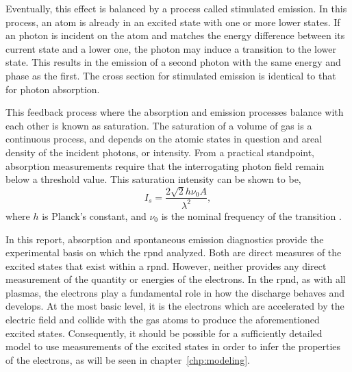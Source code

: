 Eventually, this effect is balanced by a process called stimulated emission. In
this process, an atom is already in an excited state with one or more lower
states. If an photon is incident on the atom and matches the energy difference
between its current state and a lower one, the photon may induce a transition to
the lower state. This results in the emission of a second photon with the same
energy and phase as the first. The cross section for stimulated emission is
identical to that for photon absorption.

This feedback process where the absorption and emission processes balance with
each other is known as saturation. The saturation of a volume of gas is a
continuous process, and depends on the atomic states in question and areal
density of the incident photons, or intensity. From a practical standpoint,
absorption measurements require that the interrogating photon field remain below
a threshold value. This saturation intensity can be shown \cite{Siegman1986} to
be,
\begin{equation}
  I_s = \frac{2\sqrt{2}h\nu_0A}{\lambda^2},
\end{equation}
where $h$ is Planck's constant, and $\nu_0$ is the nominal frequency of the
transition \cite{Siegman1986}.

In this report, absorption and spontaneous emission diagnostics provide the
experimental basis on which the \acs{rpnd} analyzed. Both are direct measures of
the excited states that exist within a \acs{rpnd}. However, neither provides any
direct measurement of the quantity or energies of the electrons. In the
\acs{rpnd}, as with all plasmas, the electrons play a fundamental role in how
the discharge behaves and develops. At the most basic level, it is the electrons
which are accelerated by the electric field and collide with the gas atoms to
produce the aforementioned excited states. Consequently, it should be possible
for a sufficiently detailed model to use measurements of the excited states in
order to infer the properties of the electrons, as will be seen in
chapter~\ref{chp:modeling}.

